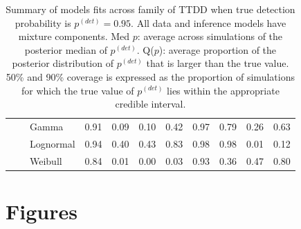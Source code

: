 \documentclass[useAMS,usenatbib,referee,12pt]{article}
\newcommand{\pdet}{p^{(det)}}
\begin{document}
\begin{table}[ht]
\begin{tabular}{l|l|l|cccc|cccc}
\cline{2-11}
& \parbox[t]{2mm}{}  & Gamma & 0.91 & 0.09 & 0.10 & 0.42 & 0.97 & 0.79 & 0.26 & 0.63 \\ 
   &  & Lognormal & 0.94 & 0.40 & 0.43 & 0.83 & 0.98 & 0.98 & 0.01 & 0.12 \\ 
   &  & Weibull & 0.84 & 0.01 & 0.00 & 0.03 & 0.93 & 0.36 & 0.47 & 0.80 \\ 
   \hline
\end{tabular}
\caption{Summary of models fits across family of TTDD when true detection probability is $\pdet = 0.95$.
All data and inference models have mixture components.
Med $p$: average across simulations of the posterior median of $\pdet$.  
Q($p$): average proportion of the posterior distribution of $\pdet$ that is larger than the true value.  
50\% and 90\% coverage is expressed as the proportion of simulations for which the true value of $\pdet$ lies within the appropriate credible interval.}
\end{table}

\FloatBarrier



\section{Figures}
\end{document}
